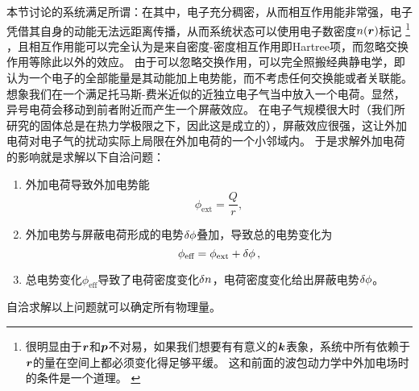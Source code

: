 本节讨论的系统满足所谓：在其中，电子充分稠密，从而相互作用能非常强，电子凭借其自身的动能无法远距离传播，从而系统状态可以使用电子数密度$n(\vb*{r})$标记%
\footnote{
    很明显由于$\vb*{r}$和$\vb*{p}$不对易，如果我们想要有有意义的$\vb*{k}$表象，系统中所有依赖于$\vb*{r}$的量在空间上都必须变化得足够平缓。
    这和前面的波包动力学中外加电场时的条件是一个道理。
    \label{note:smooth-electron-distribution}
}%
，且相互作用能可以完全认为是来自密度-密度相互作用即Hartree项，而忽略交换作用等除此以外的效应。
由于可以忽略交换作用，可以完全照搬经典静电学，即认为一个电子的全部能量是其动能加上电势能，而不考虑任何交换能或者关联能。
想象我们在一个满足托马斯-费米近似的近独立电子气当中放入一个电荷。显然，异号电荷会移动到前者附近而产生一个屏蔽效应。
在电子气规模很大时（我们所研究的固体总是在热力学极限之下，因此这是成立的），屏蔽效应很强，这让外加电荷对电子气的扰动实际上局限在外加电荷的一个小邻域内。
于是求解外加电荷的影响就是求解以下自洽问题：
\begin{enumerate}
    \item 外加电荷导致外加电势能
    \begin{equation}
        \phi_\text{ext} = \frac{Q}{r},
    \end{equation}
    \item 外加电势与屏蔽电荷形成的电势$\var{\phi}$叠加，导致总的电势变化为
    \begin{equation}
        \phi_\text{eff} = \phi_\text{ext} + \var{\phi},
    \end{equation}
    \item 总电势变化$\phi_\text{eff}$导致了电荷密度变化$\var{n}$，电荷密度变化给出屏蔽电势$\var{\phi}$。
\end{enumerate}
自洽求解以上问题就可以确定所有物理量。

